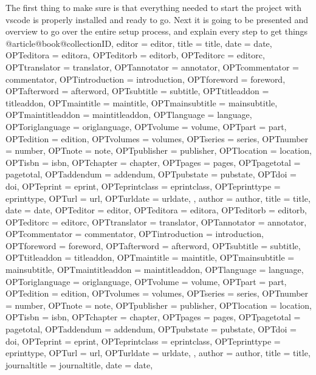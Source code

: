 The first thing to make sure is that everything needed to start the project with \ac{vscode} is properly installed and ready to go. Next it is going to be presented and overview to go over the entire setup process, and explain every step to get things @article{@book{@collection{ID,
			editor = {editor},
			title = {title},
			date = {date},
			OPTeditora = {editora},
			OPTeditorb = {editorb},
			OPTeditorc = {editorc},
			OPTtranslator = {translator},
			OPTannotator = {annotator},
			OPTcommentator = {commentator},
			OPTintroduction = {introduction},
			OPTforeword = {foreword},
			OPTafterword = {afterword},
			OPTsubtitle = {subtitle},
			OPTtitleaddon = {titleaddon},
			OPTmaintitle = {maintitle},
			OPTmainsubtitle = {mainsubtitle},
			OPTmaintitleaddon = {maintitleaddon},
			OPTlanguage = {language},
			OPToriglanguage = {origlanguage},
			OPTvolume = {volume},
			OPTpart = {part},
			OPTedition = {edition},
			OPTvolumes = {volumes},
			OPTseries = {series},
			OPTnumber = {number},
			OPTnote = {note},
			OPTpublisher = {publisher},
			OPTlocation = {location},
			OPTisbn = {isbn},
			OPTchapter = {chapter},
			OPTpages = {pages},
			OPTpagetotal = {pagetotal},
			OPTaddendum = {addendum},
			OPTpubstate = {pubstate},
			OPTdoi = {doi},
			OPTeprint = {eprint},
			OPTeprintclass = {eprintclass},
			OPTeprinttype = {eprinttype},
			OPTurl = {url},
			OPTurldate = {urldate},
		}
		,
		author = {author},
		title = {title},
		date = {date},
		OPTeditor = {editor},
		OPTeditora = {editora},
		OPTeditorb = {editorb},
		OPTeditorc = {editorc},
		OPTtranslator = {translator},
		OPTannotator = {annotator},
		OPTcommentator = {commentator},
		OPTintroduction = {introduction},
		OPTforeword = {foreword},
		OPTafterword = {afterword},
		OPTsubtitle = {subtitle},
		OPTtitleaddon = {titleaddon},
		OPTmaintitle = {maintitle},
		OPTmainsubtitle = {mainsubtitle},
		OPTmaintitleaddon = {maintitleaddon},
		OPTlanguage = {language},
		OPToriglanguage = {origlanguage},
		OPTvolume = {volume},
		OPTpart = {part},
		OPTedition = {edition},
		OPTvolumes = {volumes},
		OPTseries = {series},
		OPTnumber = {number},
		OPTnote = {note},
		OPTpublisher = {publisher},
		OPTlocation = {location},
		OPTisbn = {isbn},
		OPTchapter = {chapter},
		OPTpages = {pages},
		OPTpagetotal = {pagetotal},
		OPTaddendum = {addendum},
		OPTpubstate = {pubstate},
		OPTdoi = {doi},
		OPTeprint = {eprint},
		OPTeprintclass = {eprintclass},
		OPTeprinttype = {eprinttype},
		OPTurl = {url},
		OPTurldate = {urldate},
	}
	,
	author = {author},
	title = {title},
	journaltitle = {journaltitle},
	date = {date},
}
